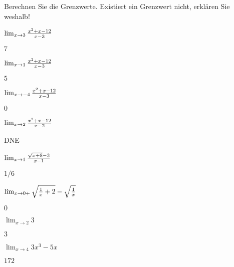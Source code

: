 \begin{exercises}

\noindent Berechnen Sie die Grenzwerte. Existiert ein Grenzwert nicht, erklären Sie weshalb!

\twocol

\begin{exercise} $\lim_{x\to 3}{x^2+x-12\over x-3}$
\begin{answer} $7$
\end{answer}\end{exercise}

\begin{exercise} $\lim_{x\to 1}{x^2+x-12\over x-3}$
\begin{answer} $5$
\end{answer}\end{exercise}

\begin{exercise} $\lim_{x\to -4}{x^2+x-12\over x-3}$
\begin{answer} $0$
\end{answer}\end{exercise}

\begin{exercise} $\lim_{x\to 2} {x^2+x-12\over x-2}$
\begin{answer} DNE
\end{answer}\end{exercise}

\begin{exercise} $\lim_{x\to 1} {\sqrt{x+8}-3\over x-1}$
\begin{answer} $1/6$
\end{answer}\end{exercise}

\begin{exercise} $\lim_{x\to 0+} \sqrt{{1\over x}+2} - \sqrt{1\over x}$
\begin{answer} $0$
\end{answer}\end{exercise}

\begin{exercise} $\lim _{x\to 2} 3$
\begin{answer} $3$
\end{answer}\end{exercise}

\begin{exercise} $\lim _{x\to 4 } 3x^3 - 5x $
\begin{answer} $172$
\end{answer}\end{exercise}


\end{exercises}
